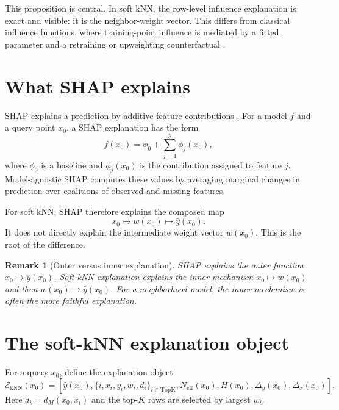 \documentclass[11pt]{article}
\newtheorem{remark}{Remark}
\newcommand{\1}{\mathbf{1}}
\newcommand{\neff}{N_{\mathrm{eff}}}
\begin{document}
This proposition is central. In soft kNN, the row-level influence explanation is exact and visible: it is the neighbor-weight vector. This differs from classical influence functions, where training-point influence is mediated by a fitted parameter and a retraining or upweighting counterfactual \citep{koh2017understanding}.

\section{What SHAP explains}

SHAP explains a prediction by additive feature contributions \citep{lundberg2017unified}. For a model $f$ and a query point $x_0$, a SHAP explanation has the form
\begin{equation}
 f(x_0)=\phi_0+\sum_{j=1}^p \phi_j(x_0),
 \label{eq:shap_decomp}
\end{equation}
where $\phi_0$ is a baseline and $\phi_j(x_0)$ is the contribution assigned to feature $j$. Model-agnostic SHAP computes these values by averaging marginal changes in prediction over coalitions of observed and missing features.

For soft kNN, SHAP therefore explains the composed map
\[
x_0 \longmapsto w(x_0) \longmapsto \hat y(x_0).
\]
It does not directly explain the intermediate weight vector $w(x_0)$. This is the root of the difference.

\begin{remark}[Outer versus inner explanation]
SHAP explains the outer function $x_0\mapsto \hat y(x_0)$. Soft-kNN explanation explains the inner mechanism $x_0\mapsto w(x_0)$ and then $w(x_0)\mapsto \hat y(x_0)$. For a neighborhood model, the inner mechanism is often the more faithful explanation.
\end{remark}

\section{The soft-kNN explanation object}

For a query $x_0$, define the explanation object
\begin{equation}
\mathcal E_{\mathrm{kNN}}(x_0)=
\left[
\hat y(x_0),
\{i,x_i,y_i,w_i,d_i\}_{i\in \mathrm{TopK}},
\neff(x_0),
H(x_0),
\Delta_y(x_0),
\Delta_x(x_0)
\right].
\label{eq:knn_explanation_object}
\end{equation}
Here $d_i=d_M(x_0,x_i)$ and the top-$K$ rows are selected by largest $w_i$.
\end{document}
